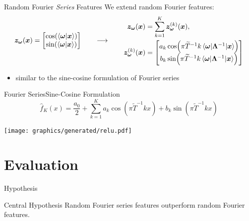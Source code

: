 \documentclass[
	USenglish,
	aspectratio=43,
	color={accentcolor=1c},
	logo=true,
	colorframetitle=true,
	hyperref={pdfpagelabels=true},
]{tudabeamer}
\newcommand{\hypOne}{
	\begin{block}{Central Hypothesis}
		Random Fourier series features outperform random Fourier features.
	\end{block}
}
\begin{document}
		\begin{frame}{Random Fourier \emph{Series} Features}
			We extend random Fourier features:
			\begin{equation}
				\begin{aligned}
					\vec{z}_{\vec{\omega}}(\vec{x}) &=
						\begin{bmatrix}
							\cos(\ip{\vec{\omega}}{\vec{x}}) \\
							\sin(\ip{\vec{\omega}}{\vec{x}})
						\end{bmatrix}
				\end{aligned}
				\quad\longrightarrow\qquad
				\begin{aligned}
					\vec{z}_{\vec{\omega}}(\vec{x}) &= \sum_{k = 1}^{K} \vec{z}_{\vec{\omega}}^{(k)}(\vec{x}), \\
					\vec{z}_{\vec{\omega}}^{(k)}(\vec{x}) &=
						\begin{bmatrix}
							a_k \cos(\pi \tilde{T}^{-1} k \mel{\vec{\omega}}{\bm{\Lambda}^{-1}}{\vec{x}}) \\
							b_k \sin(\pi \tilde{T}^{-1} k \mel{\vec{\omega}}{\bm{\Lambda}^{-1}}{\vec{x}})
						\end{bmatrix}
				\end{aligned}
			\end{equation}
			\begin{itemize}
				\item<+-> similar to the sine-cosine formulation of Fourier series
			\end{itemize}
		\end{frame}

		\begin{frame}{Fourier Series}{Sine-Cosine Formulation}
			\begin{equation}
				\hat{f}_K(x) = \frac{a_0}{2} + \sum_{k = 1}^{K} a_k \cos(\pi \tilde{T}^{-1} k x) + b_k \sin(\pi \tilde{T}^{-1} k x)
			\end{equation}
			\begin{center}
				\texttt{[image: graphics/generated/relu.pdf]}
			\end{center}
		\end{frame}

	\section{Evaluation}
		\begin{frame}{Hypothesis}
			\hypOne
		\end{frame}
\end{document}
